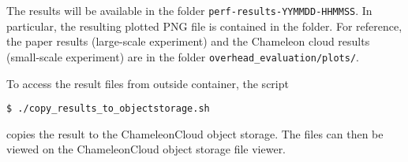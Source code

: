 \documentclass[twoside]{article}
\begin{document}
The results will be available in the folder \texttt{perf-results-YYMMDD-HHMMSS}.
In particular, the resulting plotted PNG file is contained in the folder.
For reference, the paper results (large-scale experiment) and the Chameleon cloud results (small-scale experiment) are in the folder \texttt{overhead\_evaluation/plots/}.

To access the result files from outside container, the script 

{
\small
\begin{verbatim}
$ ./copy_results_to_objectstorage.sh
\end{verbatim}
}

copies the result to the ChameleonCloud object storage.
The files can then be viewed on the ChameleonCloud object storage file viewer.

\end{document}
